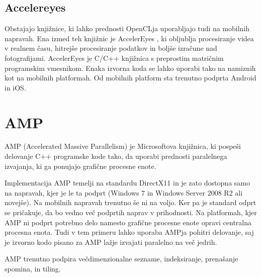 \subsection{Accelereyes}

Obstajajo knjižnice, ki lahko prednosti OpenCLja uporabljajo tudi na mobilnih napravah. Ena izmed teh knjižnic je AccelerEyes \cite{accelereyes}, ki obljublja procesiranje videa v realnem času, hitrejše procesiranje podatkov in boljše izračune nad fotografijami. AccelerEyes je C/C++ knjižnica s preprostim matričnim programskim vmesnikom. Enaka izvorna koda se lahko uporabi tako na namiznih kot na mobilnih platformah. Od mobilnih platform sta trenutno podprta Android in iOS.

\section{AMP}

AMP (Accelerated Massive Parallelism) je Microsoftova knjižnica, ki pospeši delovanje C++ programske kode tako, da uporabi prednosti paralelnega izvajanja, ki ga ponujajo grafične procesne enote. 

Implementacija AMP temelji na standardu DirectX11 in je zato dostopna samo na napravah, kjer je le ta podprt (Windows 7 in Windows Server 2008 R2 ali novejše). Na mobilnih napravah trenutno še ni na voljo. Ker pa je standard odprt se pričakuje, da bo vedno več podprtih naprav v prihodnosti. Na platformah, kjer AMP ni podprt potrebno delo namesto grafične procesne enote opravi centralna procesna enota. Tudi v tem primeru lahko uporaba AMPja pohitri delovanje, saj je izvorno kodo pisano za AMP lažje izvajati paralelno na več jedrih.

AMP trenutno podpira večdimenzionalne sezname, indeksiranje, prenašanje spomina, in tiling.
